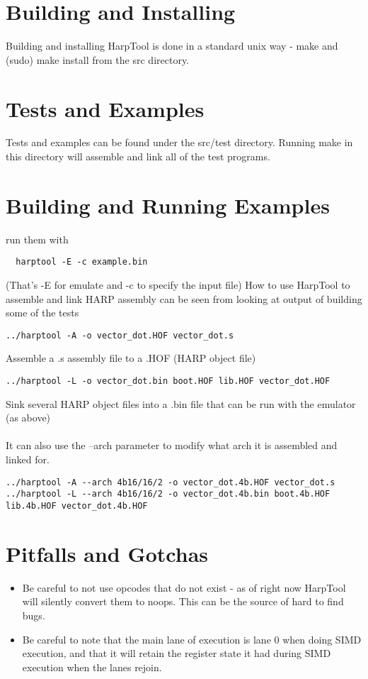 \documentclass[10pt,letterpaper]{article}
\begin{document}
\section*{Building and Installing}
Building and installing HarpTool is done in a standard unix way - make and (sudo) make install from the src directory.

\section*{Tests and Examples}
Tests and examples can be found under the src/test directory. Running make in this directory will assemble and link all of the test programs.

\section*{Building and Running Examples}
run them with \begin{verbatim}
  harptool -E -c example.bin
\end{verbatim}
(That's -E for emulate and -c to specify the input file)
How to use HarpTool to assemble and link HARP assembly can be seen from looking at output of building some of the tests
\begin{verbatim}
../harptool -A -o vector_dot.HOF vector_dot.s
\end{verbatim}
Assemble a .s assembly file to a .HOF (HARP object file)
\begin{verbatim}
../harptool -L -o vector_dot.bin boot.HOF lib.HOF vector_dot.HOF
\end{verbatim}
Sink several HARP object files into a .bin file that can be run with the emulator (as above)\\
\\
It can also use the --arch parameter to modify what arch it is assembled and linked for.
\begin{verbatim}
../harptool -A --arch 4b16/16/2 -o vector_dot.4b.HOF vector_dot.s
../harptool -L --arch 4b16/16/2 -o vector_dot.4b.bin boot.4b.HOF lib.4b.HOF vector_dot.4b.HOF
\end{verbatim}

\section*{Pitfalls and Gotchas}
\begin{itemize}


\item{Be careful to not use opcodes that do not exist - as of right now HarpTool will silently convert them to noops. This can be the source of hard to find bugs.}
\item{Be careful to note that the main lane of execution is lane 0 when doing SIMD execution, and that it will retain the register state it had during SIMD execution when the lanes rejoin.}
\end{itemize}
\end{document}
